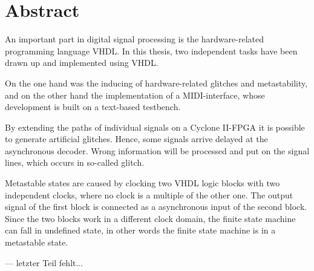 
\chapter*{Abstract}\label{chap.abstract}

An important part in digital signal processing is the hardware-related programming language VHDL. In this thesis, two independent tasks have been drawn up and implemented using VHDL.

On the one hand was the inducing of hardware-related glitches and metastability, and on the other hand the implementation of a MIDI-interface, whose development is built on a text-based testbench.

By extending the paths of individual signals on a Cyclone II-FPGA it is possible to generate artificial glitches. Hence, some signals arrive delayed at the asynchronous decoder. Wrong information will be processed and put on the signal lines, which occurs in so-called glitch.

Metastable states are caused by clocking two VHDL logic blocks with two independent clocks, where no clock is a multiple of the other one. The output signal of the first block is connected as a asynchronous input of the second block. Since the two blocks work in a different clock domain, the finite state machine can fall in undefined state, in other words the finite state machine is in a metastable state.

--- letzter Teil fehlt... 